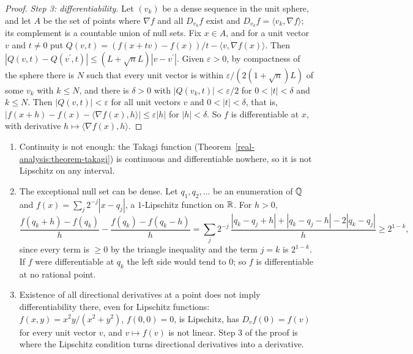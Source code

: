 \begin{proof}
\emph{Step 3: differentiability.} Let $(v_k)$ be a dense sequence in the unit sphere, and let $A$ be the set of points where $\nabla f$ and all $D_{v_k}f$ exist and
$D_{v_k}f = \langle v_k, \nabla f\rangle$; its complement is a countable union of null sets. Fix $x \in A$, and for a unit vector $v$ and $t \neq 0$ put
$Q(v, t) = (f(x + tv) - f(x))/t - \langle v, \nabla f(x)\rangle$. Then $|Q(v, t) - Q(v^{\prime}, t)| \leq (L + \sqrt nL)|v - v^{\prime}|$. Given $\varepsilon > 0$, by compactness of the
sphere there is $N$ such that every unit vector is within $\varepsilon/(2(1 + \sqrt n)L)$ of some $v_k$ with $k \leq N$, and there is $\delta > 0$ with $|Q(v_k, t)| < \varepsilon/2$ for
$0 < |t| < \delta$ and $k \leq N$. Then $|Q(v, t)| < \varepsilon$ for all unit vectors $v$ and $0 < |t| < \delta$, that is, $|f(x + h) - f(x) - \langle\nabla f(x), h\rangle| \leq \varepsilon|h|$ for
$|h| < \delta$. So $f$ is differentiable at $x$, with derivative $h \mapsto \langle\nabla f(x), h\rangle$.
\end{proof}

\begin{counterexample}\label{measure-theory:counterexample-rademacher}
\begin{enumerate}
\item Continuity is not enough: the Takagi function (Theorem~\ref{real-analysis:theorem-takagi}) is continuous and differentiable nowhere, so it is not Lipschitz on any interval.
\item The exceptional null set can be dense. Let $q_1, q_2, \ldots$ be an enumeration of $\mathbb{Q}$ and $f(x) = \sum_j2^{-j}|x - q_j|$, a $1$-Lipschitz function on $\mathbb{R}$. For $h > 0$,
\[
\frac{f(q_k + h) - f(q_k)}{h} - \frac{f(q_k) - f(q_k - h)}{h} = \sum_j2^{-j}\,\frac{|q_k - q_j + h| + |q_k - q_j - h| - 2|q_k - q_j|}{h} \geq 2^{1-k},
\]
since every term is $\geq 0$ by the triangle inequality and the term $j = k$ is $2^{1-k}$. If $f$ were differentiable at $q_k$ the left side would tend to $0$; so $f$ is differentiable at no
rational point.
\item Existence of all directional derivatives at a point does not imply differentiability there, even for Lipschitz functions: $f(x, y) = x^2y/(x^2 + y^2)$, $f(0, 0) = 0$, is Lipschitz,
has $D_vf(0) = f(v)$ for every unit vector $v$, and $v \mapsto f(v)$ is not linear. Step 3 of the proof is where the Lipschitz condition turns directional derivatives into a derivative.
\end{enumerate}
\end{counterexample}

